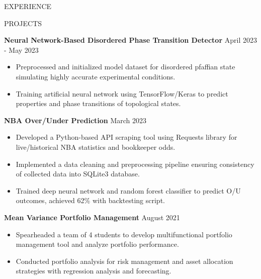 \documentclass{resume} %
\begin{document}
\begin{rSection}{EXPERIENCE}
\begin{itemize}
    
 \end{itemize}

\end{rSection} 

\vspace{-0.5em}
\begin{rSection}{PROJECTS}
\vspace{-1.25em}

\item  \textbf{Neural Network-Based Disordered Phase Transition Detector} \hfill {April 2023 - May 2023}
\begin{itemize}
   \vspace{-0.6em}
   \itemsep -5.8pt {}
   \item Preprocessed and initialized model dataset for disordered pfaffian state simulating highly accurate experimental conditions.
   \item Training artificial neural network using TensorFlow/Keras to predict properties and phase transitions of topological states.
\end{itemize}

\item  \textbf{NBA Over/Under Prediction} \hfill {March 2023}
\begin{itemize}
   \vspace{-0.6em}
   \itemsep -5.8pt {}
   \item Developed a Python-based API scraping tool using Requests library for live/historical NBA statistics and bookkeeper odds.
   \item Implemented a data cleaning and preprocessing pipeline ensuring consistency of collected data into SQLite3 database.
   \item Trained deep neural network and random forest classifier to predict O/U outcomes, achieved 62\% with backtesting script. 
  
\end{itemize}

\item \textbf{Mean Variance Portfolio Management} \hfill August 2021
\begin{itemize}
   \vspace{-0.6em}
   \itemsep -5.8pt {}
   \item Spearheaded a team of 4 students to develop multifunctional portfolio management tool and analyze portfolio performance.
   \item Conducted portfolio analysis for risk management and asset allocation strategies with regression analysis and forecasting.
\end{itemize}

\end{rSection} 
\end{document}
